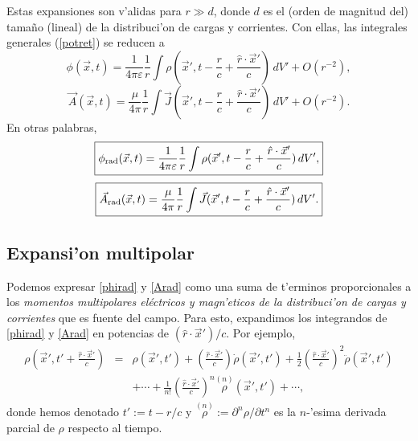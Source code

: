 Estas expansiones son v'alidas para $r\gg d$, donde $d$ es el (orden de magnitud del) tamaño (lineal) de la distribuci'on de cargas y corrientes. Con ellas, las integrales generales (\ref{potret}) se reducen a
\begin{equation}
 \phi(\vec{x},t)=\frac{1}{4\pi\varepsilon}\frac{1}{r}\int\rho(\vec{x}',t-\frac{r}{c}+\frac{\hat{r}\cdot\vec{x}'}{c})\,dV'+O(r^{-2}),
\end{equation}
\begin{equation}
 \vec{A}(\vec{x},t)=\frac{\mu}{4\pi}\frac{1}{r}\int\vec{J}(\vec{x}',t-\frac{r}{c}+\frac{\hat{r}\cdot\vec{x}'}{c})\,dV'+O(r^{-2}).
\end{equation}
En otras palabras,
\begin{equation}
 \boxed{\phi_{\rm rad}(\vec{x},t)
=\frac{1}{4\pi\varepsilon}\frac{1}{r}\int\rho(\vec{x}',t-\frac{r}{c}+\frac{\hat{r}\cdot\vec{x}'}{c})\,dV',} \label{phirad}
\end{equation}
\begin{equation}
 \boxed{\vec{A}_{\rm rad}(\vec{x},t)
=\frac{\mu}{4\pi}\frac{1}{r}\int\vec{J}(\vec{x}',t-\frac{r}{c}+\frac{\hat{r}\cdot\vec{x}'}{c})\,dV'.} \label{Arad}
\end{equation}

\subsection{Expansi'on multipolar}\label{sec:emr}

Podemos expresar \eqref{phirad} y \eqref{Arad} como una suma de t'erminos proporcionales a los \textit{momentos multipolares eléctricos y magn'eticos de la distribuci'on de cargas y corrientes} que es fuente del campo. Para esto, expandimos los integrandos de \eqref{phirad} y \eqref{Arad} en potencias de $(\hat{r}\cdot\vec{x}')/c$. Por ejemplo,
\begin{eqnarray}
 \rho(\vec{x}',t'+\frac{\hat{r}\cdot\vec{x}'}{c})&=&\rho(\vec{x}',t')+\left(\frac{\hat{r}\cdot\vec{x}'}{c}\right)\dot\rho(\vec{x}',t')+\frac{1}{2}\left(\frac{\hat{r}\cdot\vec{x}'}{c}\right)^2\ddot\rho(\vec{x}',t') \nonumber\\
 &&+\cdots+\frac{1}{n!}\left(\frac{\hat{r}\cdot\vec{x}'}{c}\right)^n\stackrel{(n)}{\rho}\!\!\!(\vec{x}',t')+\cdots ,
\end{eqnarray}
donde hemos denotado $t':=t-r/c$ y $\stackrel{(n)}{\rho}:=\partial^n\rho/\partial t^n$ es la $n$-'esima derivada parcial de $\rho$ respecto al tiempo.

